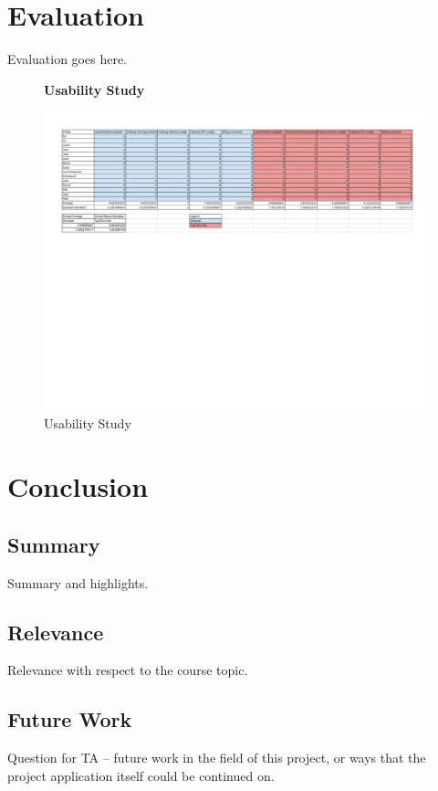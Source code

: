 \documentclass[12pt]{article}
\begin{document}
	\section{Evaluation}
	Evaluation goes here.
\begin{figure}[h]
	\centering
	\textbf{Usability Study}\par\medskip
	\includegraphics{usageStudy}
	\caption{Usability Study}
	\label{figUsage}
\end{figure}
	
	\section{Conclusion}
	
	\subsection{Summary}
	Summary and highlights.
	
	\subsection{Relevance}
	Relevance with respect to the course topic.
	
	\subsection{Future Work}
	Question for TA -- future work in the field of this project, or ways that the project application itself could be continued on.
	
	
	\setcounter{secnumdepth}{0}
\end{document}

